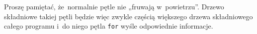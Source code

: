 \documentclass[10pt,t]{beamer}
\begin{document}
\begin{frame}
  Proszę pamiętać, że~normalnie pętle nie „fruwają w~powietrzu”. Drzewo
  składniowe takiej pętli będzie więc zwykle częścią większego drzewa
  składniowego całego programu i~do niego pętla \texttt{for} wyśle
  odpowiednie informacje.



\end{frame}













\end{document}
